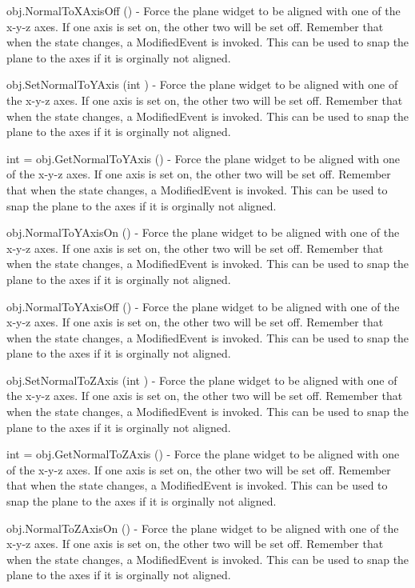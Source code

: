 \begin{DoxyItemize}
\item {\ttfamily obj.\-Normal\-To\-X\-Axis\-Off ()} -\/ Force the plane widget to be aligned with one of the x-\/y-\/z axes. If one axis is set on, the other two will be set off. Remember that when the state changes, a Modified\-Event is invoked. This can be used to snap the plane to the axes if it is orginally not aligned.  
\item {\ttfamily obj.\-Set\-Normal\-To\-Y\-Axis (int )} -\/ Force the plane widget to be aligned with one of the x-\/y-\/z axes. If one axis is set on, the other two will be set off. Remember that when the state changes, a Modified\-Event is invoked. This can be used to snap the plane to the axes if it is orginally not aligned.  
\item {\ttfamily int = obj.\-Get\-Normal\-To\-Y\-Axis ()} -\/ Force the plane widget to be aligned with one of the x-\/y-\/z axes. If one axis is set on, the other two will be set off. Remember that when the state changes, a Modified\-Event is invoked. This can be used to snap the plane to the axes if it is orginally not aligned.  
\item {\ttfamily obj.\-Normal\-To\-Y\-Axis\-On ()} -\/ Force the plane widget to be aligned with one of the x-\/y-\/z axes. If one axis is set on, the other two will be set off. Remember that when the state changes, a Modified\-Event is invoked. This can be used to snap the plane to the axes if it is orginally not aligned.  
\item {\ttfamily obj.\-Normal\-To\-Y\-Axis\-Off ()} -\/ Force the plane widget to be aligned with one of the x-\/y-\/z axes. If one axis is set on, the other two will be set off. Remember that when the state changes, a Modified\-Event is invoked. This can be used to snap the plane to the axes if it is orginally not aligned.  
\item {\ttfamily obj.\-Set\-Normal\-To\-Z\-Axis (int )} -\/ Force the plane widget to be aligned with one of the x-\/y-\/z axes. If one axis is set on, the other two will be set off. Remember that when the state changes, a Modified\-Event is invoked. This can be used to snap the plane to the axes if it is orginally not aligned.  
\item {\ttfamily int = obj.\-Get\-Normal\-To\-Z\-Axis ()} -\/ Force the plane widget to be aligned with one of the x-\/y-\/z axes. If one axis is set on, the other two will be set off. Remember that when the state changes, a Modified\-Event is invoked. This can be used to snap the plane to the axes if it is orginally not aligned.  
\item {\ttfamily obj.\-Normal\-To\-Z\-Axis\-On ()} -\/ Force the plane widget to be aligned with one of the x-\/y-\/z axes. If one axis is set on, the other two will be set off. Remember that when the state changes, a Modified\-Event is invoked. This can be used to snap the plane to the axes if it is orginally not aligned.  

\end{DoxyItemize}
